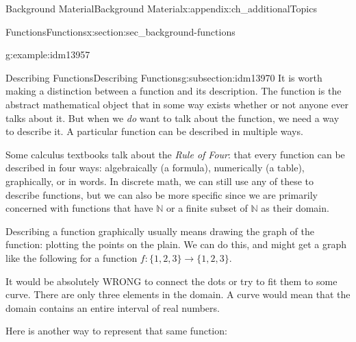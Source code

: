 \documentclass[oneside,10pt,]{book}
\numberwithin{equation}{chapter}
\def\N{\mathbb N}
\begin{document}
\begin{appendixptx}{Background Material}{}{Background Material}{}{}{x:appendix:ch_additionalTopics}
\begin{sectionptx}{Functions}{}{Functions}{}{}{x:section:sec_background-functions}
\begin{introduction}{}
\begin{example}{}{g:example:idm13957}
\begin{enumerate}
\end{enumerate}
%
\end{example}
\end{introduction}%
%
%
\typeout{************************************************}
\typeout{************************************************}
%
\begin{subsectionptx}{Describing Functions}{}{Describing Functions}{}{}{g:subsection:idm13970}
It is worth making a distinction between a function and its description.  The function is the abstract mathematical object that in some way exists whether or not anyone ever talks about it.  But when we \emph{do} want to talk about the function, we need a way to describe it.  A particular function can be described in multiple ways.%
\par
Some calculus textbooks talk about the \emph{Rule of Four}: that every function can be described in four ways: algebraically (a formula), numerically (a table), graphically, or in words.  In discrete math, we can still use any of these to describe functions, but we can also be more specific since we are primarily concerned with functions that have \(\N\) or a finite subset of \(\N\) as their domain.%
\par
Describing a function graphically usually means drawing the graph of the function: plotting the points on the plain. We can do this, and might get a graph like the following for a function \(f:\{1,2,3\} \to \{1,2,3\}\).%
\begin{sidebyside}{1}{0.35}{0.35}{0}%
\begin{sbspanel}{0.3}%
%
\end{sbspanel}%
\end{sidebyside}%
\par
It would be absolutely WRONG to connect the dots or try to fit them to some curve. There are only three elements in the domain. A curve would mean that the domain contains an entire interval of real numbers.%
\par
Here is another way to represent that same function:%
\begin{sidebyside}{1}{0.415}{0.415}{0}%
\begin{sbspanel}{0.17}%

\end{sbspanel}
\end{sidebyside}
\end{subsectionptx}
\end{sectionptx}
\end{appendixptx}
\end{document}

